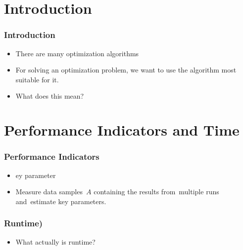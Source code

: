 \documentclass[mathserif]{beamer}%
\subtitle{A. Comparing Optimization Algorithms}%
\begin{document}
%
\startPresentation%
%
\section{Introduction}%
%
\begin{frame}%
\frametitle{Introduction}%
\begin{itemize}%
\item There are many optimization algorithms%
\item<2-> For solving an optimization problem, we want to use the algorithm most suitable for it.%
\item<3-> \alert{What does this mean?}%
\end{itemize}%
\end{frame}%
%
\section{Performance Indicators and Time}%
%
\begin{frame}%
\frametitle{Performance Indicators}%
\begin{itemize}%
\item {}ey parameter\cite{HAFR2010RPBBOB2ES,FHRA2015CDR1,WNT2010AAOAB,WWQLT2018ADCOAAPIBAWATCFEDASAIF}%
\item<4-> Measure data samples~$A$ containing the results from~\alert{multiple} runs and~\alert{estimate} key parameters.%
\end{itemize}%
\end{frame}%
%
\begin{frame}%
\frametitle{Runtime)}%
\begin{itemize}%
\item What actually is \alert{runtime}?%
\end{itemize}%
\end{frame}%
%
\end{document}
